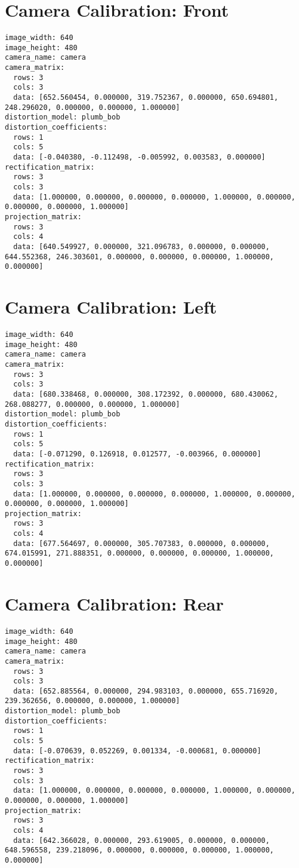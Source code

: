 \section*{Camera Calibration: Front}
\begin{lstlisting}[breaklines=true,basicstyle=\tiny]
image_width: 640
image_height: 480
camera_name: camera
camera_matrix:
  rows: 3
  cols: 3
  data: [652.560454, 0.000000, 319.752367, 0.000000, 650.694801, 248.296020, 0.000000, 0.000000, 1.000000]
distortion_model: plumb_bob
distortion_coefficients:
  rows: 1
  cols: 5
  data: [-0.040380, -0.112498, -0.005992, 0.003583, 0.000000]
rectification_matrix:
  rows: 3
  cols: 3
  data: [1.000000, 0.000000, 0.000000, 0.000000, 1.000000, 0.000000, 0.000000, 0.000000, 1.000000]
projection_matrix:
  rows: 3
  cols: 4
  data: [640.549927, 0.000000, 321.096783, 0.000000, 0.000000, 644.552368, 246.303601, 0.000000, 0.000000, 0.000000, 1.000000, 0.000000]
\end{lstlisting}


\section*{Camera Calibration: Left}
\begin{lstlisting}[breaklines=true,basicstyle=\tiny]
image_width: 640
image_height: 480
camera_name: camera
camera_matrix:
  rows: 3
  cols: 3
  data: [680.338468, 0.000000, 308.172392, 0.000000, 680.430062, 268.088277, 0.000000, 0.000000, 1.000000]
distortion_model: plumb_bob
distortion_coefficients:
  rows: 1
  cols: 5
  data: [-0.071290, 0.126918, 0.012577, -0.003966, 0.000000]
rectification_matrix:
  rows: 3
  cols: 3
  data: [1.000000, 0.000000, 0.000000, 0.000000, 1.000000, 0.000000, 0.000000, 0.000000, 1.000000]
projection_matrix:
  rows: 3
  cols: 4
  data: [677.564697, 0.000000, 305.707383, 0.000000, 0.000000, 674.015991, 271.888351, 0.000000, 0.000000, 0.000000, 1.000000, 0.000000]
\end{lstlisting}


\section*{Camera Calibration: Rear}
\begin{lstlisting}[breaklines=true,basicstyle=\tiny]
image_width: 640
image_height: 480
camera_name: camera
camera_matrix:
  rows: 3
  cols: 3
  data: [652.885564, 0.000000, 294.983103, 0.000000, 655.716920, 239.362656, 0.000000, 0.000000, 1.000000]
distortion_model: plumb_bob
distortion_coefficients:
  rows: 1
  cols: 5
  data: [-0.070639, 0.052269, 0.001334, -0.000681, 0.000000]
rectification_matrix:
  rows: 3
  cols: 3
  data: [1.000000, 0.000000, 0.000000, 0.000000, 1.000000, 0.000000, 0.000000, 0.000000, 1.000000]
projection_matrix:
  rows: 3
  cols: 4
  data: [642.366028, 0.000000, 293.619005, 0.000000, 0.000000, 648.596558, 239.218096, 0.000000, 0.000000, 0.000000, 1.000000, 0.000000]
\end{lstlisting}


